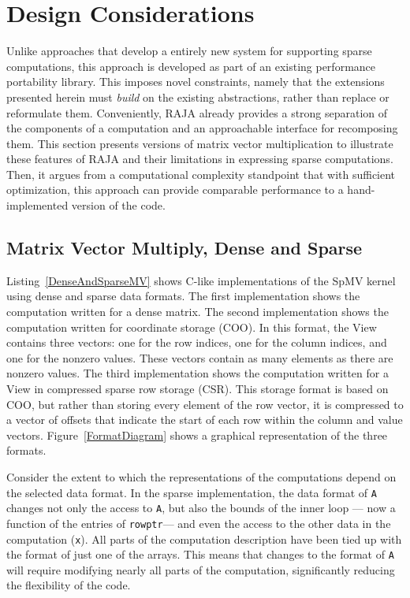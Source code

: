 \section{Design Considerations}

Unlike approaches that develop a entirely new system for supporting sparse computations, this approach is developed as part of an existing performance portability library.
This imposes novel constraints, namely that the extensions presented herein must \textit{build} on the existing abstractions, rather than replace or reformulate them.
Conveniently, RAJA already provides a strong separation of the components of a computation and an approachable interface for recomposing them.
This section presents versions of matrix vector multiplication to illustrate these features of RAJA and their limitations in expressing sparse computations.
Then, it argues from a computational complexity standpoint that with sufficient optimization, this approach can provide comparable performance to a hand-implemented version of the code.

\subsection{Matrix Vector Multiply, Dense and Sparse}

Listing~\ref{DenseAndSparseMV} shows C-like implementations of the SpMV kernel using dense and sparse data formats.
The first implementation shows the computation written for a dense matrix.
The second implementation shows the computation written for coordinate storage (COO). 
In this format, the View contains three vectors: one for the row indices, one for the column indices, and one for the nonzero values.
These vectors contain as many elements as there are nonzero values.
The third implementation shows the computation written for a View in compressed sparse row storage (CSR).
This storage format is based on COO, but rather than storing every element of the row vector, it is compressed to a vector of offsets that indicate the start of each row within the column and value vectors.
Figure~\ref{FormatDiagram} shows a graphical representation of the three formats.



Consider the extent to which the representations of the computations depend on the selected data format.
In the sparse implementation, the data format of \verb.A. changes not only the access to \verb.A., but also the bounds of the inner loop --- now a function of the entries of \verb.rowptr.--- and even the access to the other data in the computation (\verb.x.).
All parts of the computation description have been tied up with the format of just one of the arrays.
This means that changes to the format of \verb.A. will require modifying nearly all parts of the computation, significantly reducing the flexibility of the code.


